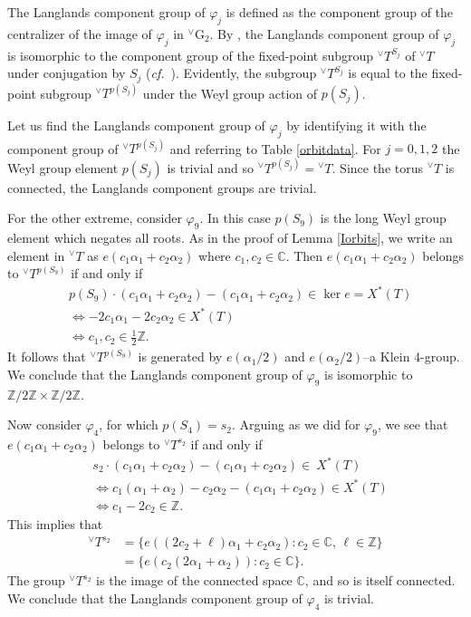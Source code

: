 \documentclass[a4paper, 11pt]{article}
\begin{document}
The Langlands component group of
$\varphi_{j}$ is defined as the component group of the 
centralizer of the image of $\varphi_{j}$ in ${^\vee}\mathrm{G}_{2}$.  By
\cite[Corollary 5.9 (c) and Lemma 12.10]{ABV}, the Langlands component
group of $\varphi_{j}$ is isomorphic to the component group of the
fixed-point subgroup 
${^\vee}T^{S_{j}}$ of ${^\vee}T$ under conjugation by $S_{j}$
(\emph{cf.}~\cite[(12.11)]{ABV}).  Evidently, the subgroup ${^\vee}T^{S_{j}}$
is equal to the fixed-point subgroup ${^\vee}T^{p(S_{j})}$ under the
Weyl group action of $p(S_{j})$. 

Let us find the Langlands component group of $\varphi_{j}$ by
identifying it with the component group of ${^\vee}T^{p(S_{j})}$ and
referring to  Table \ref{orbitdata}.  For $j = 0,1,2$ the Weyl group
element $p(S_{j})$ is trivial and so ${^\vee}T^{p(S_{j})} = {^\vee}T$.
Since the torus ${^\vee}T$ is connected, the Langlands component groups are
trivial. 

For the other extreme, consider $\varphi_{9}$.  In this case
$p(S_{9})$ is the long Weyl group element which negates all roots.
As in the proof of Lemma \ref{Iorbits}, we write an  element in ${^\vee}T$ as
$e(c_{1} \alpha_{1} + c_{2} \alpha_{2})$ where $c_{1},
c_{2} \in \mathbb{C}$.  Then $e(c_{1} \alpha_{1} + c_{2}
\alpha_{2})$ belongs to ${^\vee}T^{p(S_{9})}$ if and only if 
\begin{align*}
& p(S_{9}) \cdot (c_{1} \alpha_{1} + c_{2}  \alpha_{2})
- (c_{1} \alpha_{1} + c_{2} \alpha_{2}) \in \ker e =
X^{*}(T) \\
& \Longleftrightarrow -2c_{1}\alpha_{1} - 2c_{2} \alpha_{2} \in
X^{*}(T)\\
& \Longleftrightarrow c_{1}, c_{2} \in \frac{1}{2}\mathbb{Z}.
\end{align*}
It follows that ${^\vee}T^{p(S_{9})}$ is generated by
$e(\alpha_{1}/2)$ and $e(\alpha_{2}/2)$--a Klein 4-group.  We conclude
that the Langlands component group of $\varphi_{9}$ is isomorphic to
$\mathbb{Z}/ 2 \mathbb{Z} \times \mathbb{Z}/2 \mathbb{Z}$.  

Now consider $\varphi_{4}$, for which $p(S_{4}) = s_{2}$.  Arguing as
we did for $\varphi_{9}$,  we see that   $e(c_{1} \alpha_{1} + c_{2}
\alpha_{2})$ belongs to ${^\vee}T^{s_{2}}$ if and only if 
\begin{align*}
& s_{2} \cdot (c_{1} \alpha_{1} + c_{2}  \alpha_{2})
- (c_{1} \alpha_{1} + c_{2} \alpha_{2}) \in \
X^{*}(T) \\
& \Longleftrightarrow c_{1}(\alpha_{1}+\alpha_{2}) - c_{2} \alpha_{2}
- (c_{1} \alpha_{1} + c_{2} \alpha_{2}) \in X^{*}(T)\\
& \Longleftrightarrow c_{1}-2c_{2} \in \mathbb{Z}.
\end{align*}
This implies that 
\begin{align*}
{^\vee}T^{s_{2}} &= \{ e((2c_{2} + \ell) \alpha_{1} + c_{2}
\alpha_{2}) : c_{2} \in \mathbb{C}, \, \ell \in \mathbb{Z}\}\\
& = \{ e(c_{2}(2 \alpha_{1} + 
\alpha_{2})) : c_{2} \in \mathbb{C}\}.
\end{align*}
The group ${^\vee}T^{s_{2}}$ is the image of the connected
space $\mathbb{C}$, and so is itself connected.  We conclude that the Langlands
component group of $\varphi_{4}$ is trivial.
\end{document}
